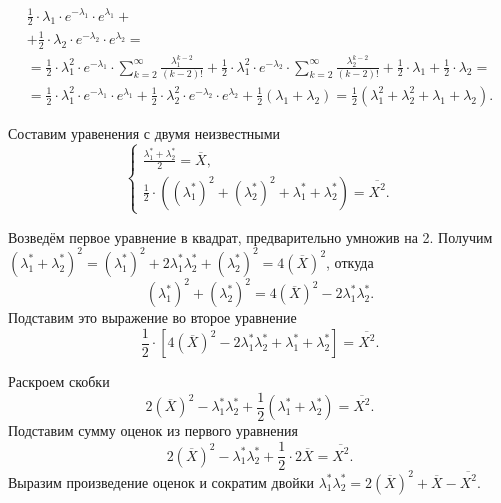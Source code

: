 \begin{equation*}
\begin{split}
    \frac{1}{2} \cdot \lambda_1 \cdot e^{- \lambda_1} \cdot e^{ \lambda_1} + \\
    + \frac{1}{2} \cdot \lambda_2  \cdot e^{- \lambda_2} \cdot e^{ \lambda_2} = \\
    = \frac{1}{2} \cdot \lambda_1^2 \cdot e^{- \lambda_1 } \cdot
    \sum \limits_{k = 2}^{ \infty } \frac{ \lambda_1^{k - 2}}{ \left( k - 2 \right)!} +
    \frac{1}{2} \cdot \lambda_1^2 \cdot e^{- \lambda_2 } \cdot
    \sum \limits_{k = 2}^{ \infty } \frac{ \lambda_2^{k - 2}}{ \left( k - 2 \right)!} +
    \frac{1}{2} \cdot \lambda_1 +
    \frac{1}{2} \cdot \lambda_2 = \\
    = \frac{1}{2} \cdot \lambda_1^2 \cdot e^{- \lambda_1 } \cdot e^{ \lambda_1} +
    \frac{1}{2} \cdot \lambda_2^2 \cdot e^{- \lambda_2 } \cdot e^{ \lambda_2} +
    \frac{1}{2} \left( \lambda_1 + \lambda_2 \right) =
    \frac{1}{2} \left( \lambda_1^2 + \lambda_2^2 + \lambda_1 + \lambda_2 \right).
  \end{split}
\end{equation*}

Составим уравенения с двумя неизвестными
$$ \begin{cases}
    \frac{ \lambda_1^* + \lambda_2^*}{2} = \overline{X}, \\
    \frac{1}{2} \cdot
    \left(
      \left( \lambda_1^* \right)^2 + \left( \lambda_2^* \right)^2 + \lambda_1^* + \lambda_2^*
    \right) =
    \overline{X^2}.
  \end{cases}$$

Возведём первое уравнение в квадрат, предварительно умножив на 2.
Получим
$ \left( \lambda_1^* + \lambda_2^* \right)^2 =
  \left( \lambda_1^* \right)^2 + 2 \lambda_1^* \lambda_2^* + \left( \lambda_2^* \right)^2 =
  4 \left( \overline{X} \right)^2$,
откуда
$$ \left( \lambda_1^* \right)^2 + \left( \lambda_2^* \right)^2 =
  4 \left( \overline{X} \right)^2 - 2 \lambda_1^* \lambda_2^*.$$
Подставим это выражение во второе уравнение
$$ \frac{1}{2} \cdot
  \left[
    4 \left( \overline{X} \right)^2 - 2 \lambda_1^* \lambda_2^* + \lambda_1^* + \lambda_2^*
  \right] =
  \overline{X^2}.$$

Раскроем скобки
$$2 \left( \overline{X} \right)^2 -
  \lambda_1^* \lambda_2^* +
  \frac{1}{2} \left( \lambda_1^* + \lambda_2^* \right) =
  \overline{X^2}.$$
Подставим сумму оценок из первого уравнения
$$2 \left( \overline{X} \right)^2 - \lambda_1^* \lambda_2^* + \frac{1}{2} \cdot 2 \overline{X} =
  \overline{X^2}.$$
Выразим произведение оценок и сократим двойки
$ \lambda_1^* \lambda_2^* =
  2 \left( \overline{X} \right)^2 + \overline{X} - \overline{X^2}$.

